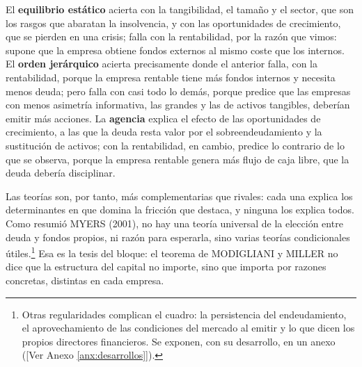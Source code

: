 \documentclass[10pt,a4paper]{article}
\newcommand{\authorfont}[1]{{\fontfamily{EBGaramond-TLF}\selectfont #1}}
\newcounter{anexo}
\begin{document}
El \textbf{equilibrio estático} acierta con la tangibilidad, el tamaño y el sector, que son los rasgos que abaratan la insolvencia, y con las oportunidades de crecimiento, que se pierden en una crisis; falla con la rentabilidad, por la razón que vimos: supone que la empresa obtiene fondos externos al mismo coste que los internos. El \textbf{orden jerárquico} acierta precisamente donde el anterior falla, con la rentabilidad, porque la empresa rentable tiene más fondos internos y necesita menos deuda; pero falla con casi todo lo demás, porque predice que las empresas con menos asimetría informativa, las grandes y las de activos tangibles, deberían emitir más acciones. La \textbf{agencia} explica el efecto de las oportunidades de crecimiento, a las que la deuda resta valor por el sobreendeudamiento y la sustitución de activos; con la rentabilidad, en cambio, predice lo contrario de lo que se observa, porque la empresa rentable genera más flujo de caja libre, que la deuda debería disciplinar.

Las teorías son, por tanto, más complementarias que rivales: cada una explica los determinantes en que domina la fricción que destaca, y ninguna los explica todos. Como resumió MYERS (2001), no hay una teoría universal de la elección entre deuda y fondos propios, ni razón para esperarla, sino varias teorías condicionales útiles.\footnote{%
    Otras regularidades complican el cuadro: la persistencia del endeudamiento, el aprovechamiento de las condiciones del mercado al emitir y lo que dicen los propios directores financieros. Se exponen, con su desarrollo, en un anexo ([\authorfont{Ver Anexo \ref{anx:desarrollos}}]).
} Esa es la tesis del bloque: el teorema de MODIGLIANI y MILLER no dice que la estructura del capital no importe, sino que importa por razones concretas, distintas en cada empresa.


\clearpage
\end{document}
